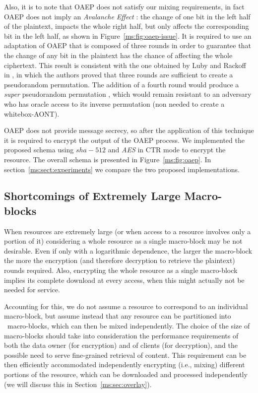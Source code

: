 {Also, it is to note that OAEP does not satisfy our mixing requirements, in fact OAEP does not imply an {\em Avalanche Effect} \cite{webster1985design}: the change of one bit in the left half of the plaintext, impacts the whole right half, but only affects the corresponding bit in the left half, as shown in Figure~\ref{ms:fig:oaep-issue}. It is required to use an adaptation of OAEP that is composed of three rounds in order to guarantee that the change of any bit in the plaintext has the chance of affecting the whole ciphertext. This result is consistent with the one obtained by Luby and Rackoff in \cite{lr88}, in which the authors proved that three rounds are sufficient to create a pseudorandom permutation. The addition of a fourth round would produce a {\em super} pseudorandom permutation \cite{lr88}, which would remain resistant to an adversary who has oracle access to its inverse permutation (non needed to create a whitebox-AONT).

OAEP does not provide message secrecy, so after the application of this technique it is required to encrypt the output of the OAEP process. We implemented the proposed schema using $sha-512$ and {\em AES} in {CTR mode} to encrypt the resource. The overall schema is presented in Figure~\ref{ms:fig:oaep}.  In section~\ref{ms:sect:experiments} we compare the two proposed implementations.

} %

\subsection{Shortcomings of Extremely Large Macro-blocks}

When resources are extremely large (or when access to a resource involves only a portion of it) considering a whole resource as a single macro-block may be not desirable. Even if only with a logarithmic dependence, the larger the macro-block the more the encryption (and therefore decryption to retrieve the plaintext) rounds required. Also, encrypting the whole resource as a single macro-block implies its complete download at every access, when this might actually not be needed for service.

Accounting for this, we do not assume a resource to correspond to an individual macro-block, but assume instead that any resource can be partitioned into \Mnum\ macro-blocks, which can then be mixed independently. The choice of the size of macro-blocks should take into consideration the performance requirements of both the data owner (for encryption) and of clients (for decryption), and the possible need to serve fine-grained retrieval of content. This requirement can be then efficiently accommodated independently encrypting (i.e., mixing) different portions of the resource, which can be downloaded and processed independently (we will discuss this in Section~\ref{ms:sec:overlay}).

